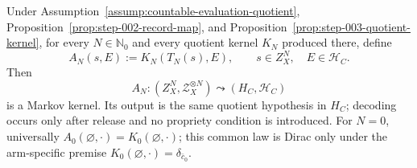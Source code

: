 \begin{proposition}\label{prop:step-003-raw-pullback}
Under Assumption~\ref{assump:countable-evaluation-quotient}, Proposition~\ref{prop:step-002-record-map}, and
Proposition~\ref{prop:step-003-quotient-kernel}, for every
\(N\in\mathbb N_0\) and every quotient kernel \(K_N\) produced there, define
\[
A_N(s,E):=K_N(T_N(s),E),
\qquad s\in Z_X^N,\quad E\in\mathcal H_C.
\tag{20}
\]
Then
\[
A_N:(Z_X^N,\mathcal Z_X^{\otimes N})
\leadsto(H_C,\mathcal H_C)
\tag{21}
\]
is a Markov kernel. Its output is the same quotient hypothesis in \(H_C\);
decoding occurs only after release and no propriety condition is introduced.
For \(N=0\), universally
\(A_0(\varnothing,\cdot)=K_0(\varnothing,\cdot)\); this common law is Dirac
only under the arm-specific premise
\(K_0(\varnothing,\cdot)=\delta_{\bar c_0}\).


\end{proposition}

